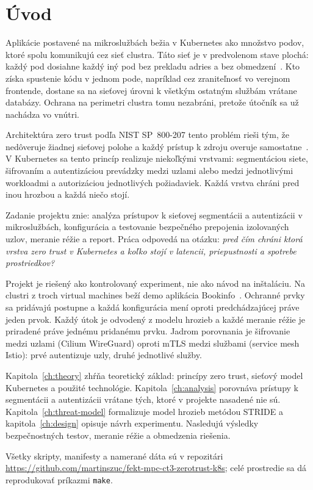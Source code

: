 \chapter*{Úvod}
{}

Aplikácie postavené na mikroslužbách bežia v Kubernetes ako množstvo podov, ktoré spolu komunikujú cez sieť clustra. Táto sieť je v predvolenom stave plochá: každý pod dosiahne každý iný pod bez prekladu adries a bez obmedzení~\cite{k8s-networking}. Kto získa spustenie kódu v jednom pode, napríklad cez zraniteľnosť vo verejnom frontende, dostane sa na sieťovej úrovni k všetkým ostatným službám vrátane databázy. Ochrana na perimetri clustra tomu nezabráni, pretože útočník sa už nachádza vo vnútri.

Architektúra zero trust podľa NIST SP~800-207 tento problém rieši tým, že nedôveruje žiadnej sieťovej polohe a každý prístup k zdroju overuje samostatne~\cite{nist-sp800-207}. V Kubernetes sa tento princíp realizuje niekoľkými vrstvami: segmentáciou siete, šifrovaním a autentizáciou prevádzky medzi uzlami alebo medzi jednotlivými workloadmi a autorizáciou jednotlivých požiadaviek. Každá vrstva chráni pred inou hrozbou a každá niečo stojí.

Zadanie projektu znie: analýza prístupov k sieťovej segmentácii a autentizácii v mikroslužbách, konfigurácia a testovanie bezpečného prepojenia izolovaných uzlov, meranie réžie a report. Práca odpovedá na otázku: \emph{pred čím chráni ktorá vrstva zero trust v Kubernetes a koľko stojí v latencii, priepustnosti a spotrebe prostriedkov?}

Projekt je riešený ako kontrolovaný experiment, nie ako návod na inštaláciu. Na clustri z troch virtual machines beží demo aplikácia Bookinfo~\cite{istio-bookinfo}. Ochranné prvky sa pridávajú postupne a každá konfigurácia mení oproti predchádzajúcej práve jeden prvok. Každý útok je odvodený z modelu hrozieb a každé meranie réžie je priradené práve jednému pridanému prvku. Jadrom porovnania je šifrovanie medzi uzlami (Cilium WireGuard) oproti mTLS medzi službami (service mesh Istio): prvé autentizuje uzly, druhé jednotlivé služby.

Kapitola~\ref{ch:theory} zhŕňa teoretický základ: princípy zero trust, sieťový model Kubernetes a použité technológie. Kapitola~\ref{ch:analysis} porovnáva prístupy k segmentácii a autentizácii vrátane tých, ktoré v projekte nasadené nie sú. Kapitola~\ref{ch:threat-model} formalizuje model hrozieb metódou STRIDE a kapitola~\ref{ch:design} opisuje návrh experimentu. Nasledujú výsledky bezpečnostných testov, meranie réžie a obmedzenia riešenia.

Všetky skripty, manifesty a namerané dáta sú v repozitári \url{https://github.com/martinszuc/fekt-mpc-ct3-zerotrust-k8s}; celé prostredie sa dá reprodukovať príkazmi \texttt{make}.
